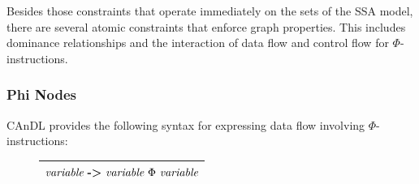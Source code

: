 
    Besides those constraints that operate immediately on the sets of the
    SSA model, there are several atomic constraints that enforce graph
    properties.
    This includes dominance relationships and the interaction of data flow and
    control flow for $\Phi$-instructions.


\subsubsection{Phi Nodes}

    CAnDL provides the following syntax for expressing data flow involving
    $\Phi$-instructions:
\begin{figure}[h]
    \centering
    \begin{tabular}{|c|}
        \hline
        $\text{\it variable}\ \text{\bf ->}\ \text{\it variable}\ \Phi\ \text{\it variable}$\\
        \hline
    \end{tabular}
\end{figure}

